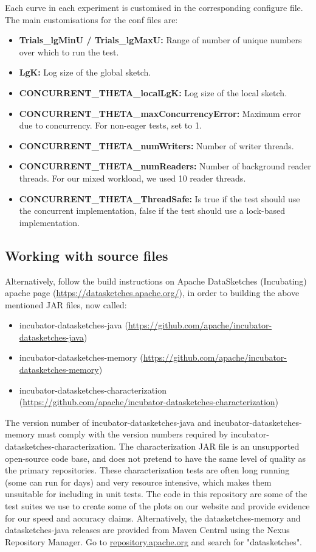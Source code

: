 \documentclass[onecolumn]{sigplanconf}
\begin{document}
{Each curve in each experiment is customised in the corresponding configure file.
The main customisations for the conf files are:
\begin{itemize}
  \item \textbf{Trials\_lgMinU / Trials\_lgMaxU:} Range of number of unique numbers over which to run the test.
  \item \textbf{LgK:} Log size of the global sketch.
  \item \textbf{CONCURRENT\_THETA\_localLgK:} Log size of the local sketch.
  \item \textbf{CONCURRENT\_THETA\_maxConcurrencyError:} Maximum error due to concurrency. For non-eager tests, set to 1.
  \item \textbf{CONCURRENT\_THETA\_numWriters:} Number of writer threads.
  \item \textbf{CONCURRENT\_THETA\_numReaders:} Number of background reader threads. For our mixed workload, we used 10 reader threads.  
  \item \textbf{CONCURRENT\_THETA\_ThreadSafe:} Is true if the test should use the concurrent implementation,
  false if the test should use a lock-based implementation.
\end{itemize}

\subsection{Working with source files}

Alternatively, follow the build instructions on Apache DataSketches (Incubating) apache
page (\url{https://datasketches.apache.org/}), in order to building the above mentioned
JAR files, now called:
\begin{itemize}
  \item incubator-datasketches-java (\url{https://github.com/apache/incubator-datasketches-java})
  \item incubator-datasketches-memory (\url{https://github.com/apache/incubator-datasketches-memory})
  \item incubator-datasketches-characterization (\url{https://github.com/apache/incubator-datasketches-characterization})
\end{itemize}

\noindent The version number of incubator-datasketches-java
and incubator-datasketches-memory must comply with the version numbers required by incubator-datasketches-characterization.
The characterization JAR file is an unsupported open-source code base, and
does not pretend to have the same level of quality as the primary repositories.
These characterization tests are often long running (some can run for days) and very resource intensive, which makes
them unsuitable for including in unit tests. The code in this repository are some of
the test suites we use to create some of the plots on our website and provide evidence for our speed and accuracy claims.
Alternatively, the datasketches-memory and datasketches-java releases are provided from Maven Central using the Nexus Repository Manager. Go to 
\url{repository.apache.org} and search for "datasketches".

}
\end{document}
